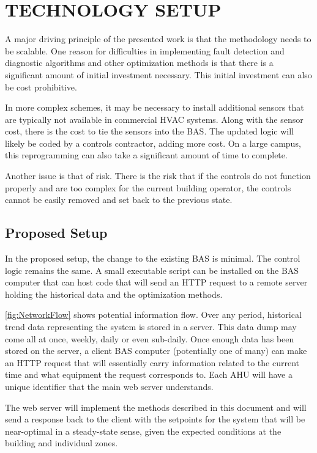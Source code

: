 \chapter{\texorpdfstring{\MakeUppercase{Technology Setup}}{Technology Setup}}

A major driving principle of the presented work is that the methodology
needs to be scalable. One reason for difficulties in implementing fault
detection and diagnostic algorithms and other optimization methods is
that there is a significant amount of initial investment necessary. This
initial investment can also be cost prohibitive. 

In more complex schemes, it may be necessary to install additional
sensors that are typically not available in commercial HVAC systems.
Along with the sensor cost, there is the cost to tie the sensors into the
BAS. The updated logic will likely be coded by a controls contractor,
adding more cost. On a large campus, this reprogramming can also take a
significant amount of time to complete. 

Another issue is that of risk. There is the risk that if the controls do
not function properly and are too complex for the current building
operator, the controls cannot be easily removed and set back to the 
previous state. 


\section{Proposed Setup}

In the proposed setup, the change to the existing BAS is
minimal. The control logic remains the same. A small executable
script can be installed on the BAS computer that can host code that will
send an HTTP request to a remote server holding the historical data and
the optimization methods. 


\figref{} \ref{fig:NetworkFlow} shows potential information flow. Over
any period, historical trend data representing the system is stored in a
server.  This data dump may come all at once, weekly, daily or even
sub-daily.  Once enough data has been stored on the server, a client BAS
computer (potentially one of many) can make an HTTP request that will
essentially carry information related to the current time and what
equipment the request corresponds to. Each AHU will have a unique identifier
that the main web server understands. 

The web server will implement the methods described in this document and
will send a response back to the client with the setpoints for the
system that will be near-optimal in a steady-state sense, given the
expected conditions at the building and individual zones. 

